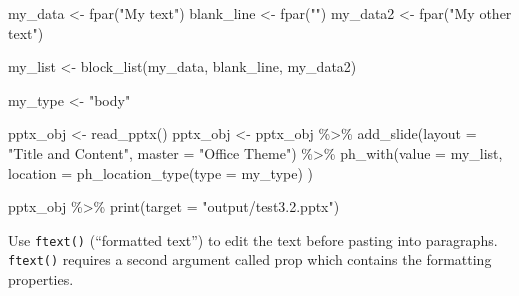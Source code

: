 \documentclass[
]{book}
\newenvironment{Shaded}{\begin{snugshade}}{\end{snugshade}}
\newcommand{\AttributeTok}[1]{\textcolor[rgb]{0.77,0.63,0.00}{#1}}
\newcommand{\FunctionTok}[1]{\textcolor[rgb]{0.00,0.00,0.00}{#1}}
\newcommand{\NormalTok}[1]{#1}
\newcommand{\OtherTok}[1]{\textcolor[rgb]{0.56,0.35,0.01}{#1}}
\newcommand{\SpecialCharTok}[1]{\textcolor[rgb]{0.00,0.00,0.00}{#1}}
\newcommand{\StringTok}[1]{\textcolor[rgb]{0.31,0.60,0.02}{#1}}
\begin{document}
\begin{Shaded}
\begin{Highlighting}[]
\NormalTok{my\_data }\OtherTok{\textless{}{-}} \FunctionTok{fpar}\NormalTok{(}\StringTok{"My text"}\NormalTok{)}
\NormalTok{blank\_line }\OtherTok{\textless{}{-}} \FunctionTok{fpar}\NormalTok{(}\StringTok{""}\NormalTok{)}
\NormalTok{my\_data2 }\OtherTok{\textless{}{-}} \FunctionTok{fpar}\NormalTok{(}\StringTok{"My other text"}\NormalTok{)}

\NormalTok{my\_list }\OtherTok{\textless{}{-}} \FunctionTok{block\_list}\NormalTok{(my\_data, blank\_line, my\_data2)}

\NormalTok{my\_type }\OtherTok{\textless{}{-}} \StringTok{"body"}

\NormalTok{pptx\_obj }\OtherTok{\textless{}{-}} \FunctionTok{read\_pptx}\NormalTok{()}
\NormalTok{pptx\_obj }\OtherTok{\textless{}{-}}\NormalTok{ pptx\_obj }\SpecialCharTok{\%\textgreater{}\%}
  \FunctionTok{add\_slide}\NormalTok{(}\AttributeTok{layout =} \StringTok{"Title and Content"}\NormalTok{, }\AttributeTok{master =} \StringTok{"Office Theme"}\NormalTok{) }\SpecialCharTok{\%\textgreater{}\%} 
  \FunctionTok{ph\_with}\NormalTok{(}\AttributeTok{value =}\NormalTok{ my\_list, }\AttributeTok{location =} \FunctionTok{ph\_location\_type}\NormalTok{(}\AttributeTok{type =}\NormalTok{ my\_type) )}

\NormalTok{pptx\_obj }\SpecialCharTok{\%\textgreater{}\%}
  \FunctionTok{print}\NormalTok{(}\AttributeTok{target =} \StringTok{"output/test3.2.pptx"}\NormalTok{) }
\end{Highlighting}
\end{Shaded}

Use \texttt{ftext()} (``formatted text'') to edit the text before pasting into paragraphs. \texttt{ftext()} requires a second argument called prop which contains the formatting properties.
\end{document}
